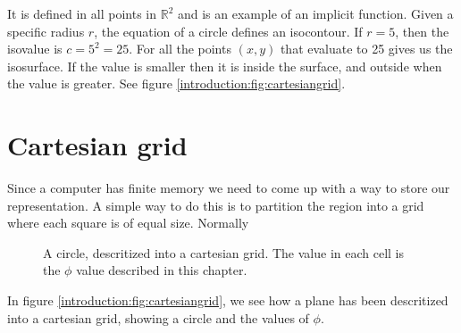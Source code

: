 It is defined in all points in $\mathbb{R}^{2}$ and is an example of
an implicit function. Given a specific radius $r$, the equation of a
circle defines an isocontour. If $r = 5$, then the isovalue is $c =
5^{2} = 25$. For all the points $(x,y)$ that evaluate to 25 gives us
the isosurface. If the value is smaller then it is inside the surface,
and outside when the value is greater. See figure
\vref{introduction:fig:cartesiangrid}.


\section*{Cartesian grid}
\begin{comment} Finite memory -> descritization of plane -> cartesian
grid is used.
\end{comment}

Since a computer has finite memory we need to come up with a way to
store our representation. A simple way to do this is to partition the region into a grid where each
square is of equal size. Normally

\begin{figure}[htb] \centering
  \caption{A circle, descritized into a cartesian grid. The value in
    each cell is the $\phi$ value described in this chapter.}
  \label{introduction:fig:cartesiangrid}
\end{figure}

In figure \vref{introduction:fig:cartesiangrid}, we see how a plane
has been descritized into a cartesian grid, showing a circle and the
values of $\phi$.

